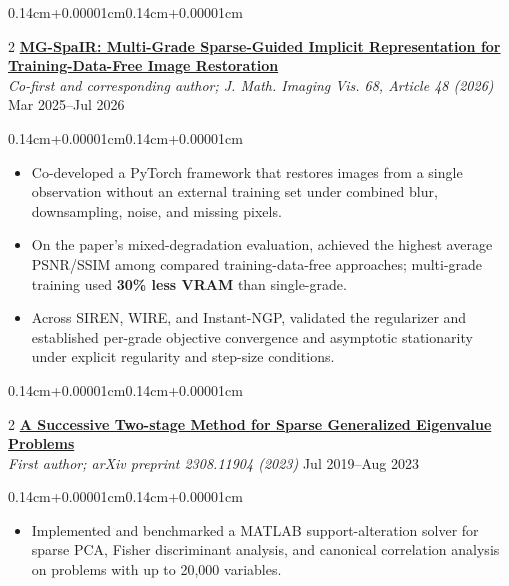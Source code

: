 \documentclass[10pt,letterpaper]{article}
\newenvironment{highlights}{\begin{itemize}[label=\textcolor{primaryColor}{\small\textbullet},topsep=0.10cm,parsep=0pt,partopsep=0pt,itemsep=0.04cm,leftmargin=0.44cm+10pt]}{\end{itemize}}
\newenvironment{onecolentry}{\begin{adjustwidth}{0.14cm+0.00001cm}{0.14cm+0.00001cm}\raggedright}{\end{adjustwidth}}
\newenvironment{twocolentry}[2][]{\onecolentry\def\secondColumn{\fontsize{9.8pt}{11.2pt}\selectfont\color{mutedColor}#2}\setcolumnwidth{\fill,3.55cm}\begin{paracol}{2}}{\switchcolumn\raggedleft\secondColumn\end{paracol}\endonecolentry}
\let\hrefWithoutArrow\href
\renewcommand{\href}[2]{\hrefWithoutArrow{#1}{\ifthenelse{\equal{#2}{}}{ }{#2\,\raisebox{.15ex}{\scriptsize\faExternalLink*}}}}
\begin{document}
\begin{twocolentry}{Mar 2025--Jul 2026}
  \textbf{\hrefWithoutArrow{https://doi.org/10.1007/s10851-026-01329-2}{\textcolor{bodyColor}{MG-SpaIR: Multi-Grade Sparse-Guided Implicit Representation for Training-Data-Free Image Restoration}}}\\
  \textit{\color{mutedColor}Co-first and corresponding author; J. Math. Imaging Vis. 68, Article 48 (2026)}
\end{twocolentry}
\begin{onecolentry}
\begin{highlights}
  \item Co-developed a PyTorch framework that restores images from a single observation without an external training set under combined blur, downsampling, noise, and missing pixels.
  \item On the paper's mixed-degradation evaluation, achieved the highest average PSNR/SSIM among compared training-data-free approaches; multi-grade training used \textbf{30\% less VRAM} than single-grade.
  \item Across SIREN, WIRE, and Instant-NGP, validated the regularizer and established per-grade objective convergence and asymptotic stationarity under explicit regularity and step-size conditions.
\end{highlights}
\end{onecolentry}
\vspace{0.11cm}

\begin{twocolentry}{Jul 2019--Aug 2023}
  \textbf{\hrefWithoutArrow{https://arxiv.org/abs/2308.11904}{\textcolor{bodyColor}{A Successive Two-stage Method for Sparse Generalized Eigenvalue Problems}}}\\
  \textit{\color{mutedColor}First author; arXiv preprint 2308.11904 (2023)}
\end{twocolentry}
\begin{onecolentry}
\begin{highlights}
  \item Implemented and benchmarked a MATLAB support-alteration solver for sparse PCA, Fisher discriminant analysis, and canonical correlation analysis on problems with up to 20,000 variables.
\end{highlights}
\end{onecolentry}
\end{document}
